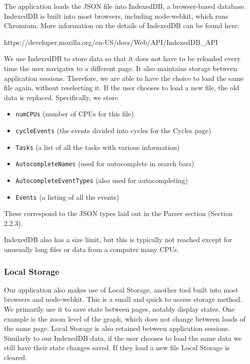 \documentclass{hmcclinic}
\begin{document}
  The application loads the JSON file into IndexedDB, a
  browser-based database. IndexedDB is built into most browsers, including
  node-webkit, which runs Chromium. More information on the details of IndexedDB can be found here:
\begin{center}
  https://developer.mozilla.org/en-US/docs/Web/API/IndexedDB\_API
\end{center}
  We use IndexedDB to store data so that it does not have to be reloaded every time the user navigates to a different page. It also
  maintains storage between application sessions. Therefore, we are able to have
  the choice to load the same file again, without reselecting it. If the user
  chooses to load a new file, the old data is replaced.
  Specifically, we store 
  \begin{itemize}
    \item \texttt{numCPUs} (number of CPUs for this file)
    \item \texttt{cycleEvents} (the events divided into cycles for the Cycles page)
    \item \texttt{Tasks} (a list of all the tasks with various information)
    \item \texttt{AutocompleteNames} (used for autocomplete in search bars)
    \item \texttt{AutocompleteEventTypes} (also used for autocompleting)
    \item \texttt{Events} (a listing of all the events)
  \end{itemize}
  These correspond to the JSON types laid
  out in the Parser section (Section 2.2.3).


  IndexedDB also has  a size limit, but this is typically not reached except for
  unusually long files or data from a computer many CPUs. 

  \subsubsection{Local Storage}

  Our application also makes use of Local Storage, another tool
  built into most browsers and node-webkit. This is a small and quick to access
  storage method. We primarily use it to save state between pages, notably
  display states. One example is the zoom level of the graph, which does not
  change between loads of the same page. Local Storage is also retained between
  application sessions. Similarly to our IndexedDB data, if the user chooses to
  load the same data we still have their state changes saved. If they load a new
  file Local Storage is cleared.
\end{document}
